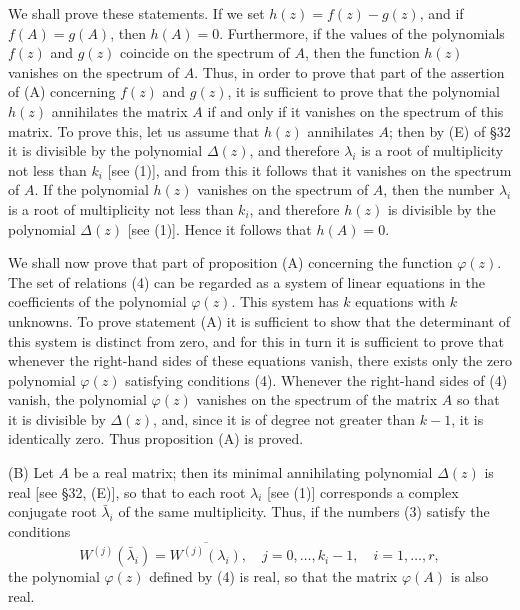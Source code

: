 \documentclass[10pt,a5paper]{book}
\theoremstyle{plain}
\theoremstyle{definition}
\theoremstyle{remark}
\begin{document}
We shall prove these statements. If we set $h(z)=f(z)-g(z)$, and if $f(A)=g(A)$, then $h(A)=0$. Furthermore, if the values of the polynomials $f(z)$ and $g(z)$ coincide on the spectrum of $A$, then the function $h(z)$ vanishes on the spectrum of $A$. Thus, in order to prove that part of the assertion of (A) concerning $f(z)$ and $g(z)$, it is sufficient to prove that the polynomial $h(z)$ annihilates the matrix $A$ if and only if it vanishes on the spectrum of this matrix. To prove this, let us assume that $h(z)$ annihilates $A$; then by (E) of §32 it is divisible by the polynomial $\Delta(z)$, and therefore $\lambda_{i}$ is a root of multiplicity not less than $k_{i}$ [see (1)], and from this it follows that it vanishes on the spectrum of $A$. If the polynomial $h(z)$ vanishes on the spectrum of $A$, then the number $\lambda_{i}$ is a root of multiplicity not less than $k_{i}$, and therefore $h(z)$ is divisible by the polynomial $\Delta(z)$ [see (1)]. Hence it follows that $h(A)=0$.

We shall now prove that part of proposition (A) concerning the function $\varphi(z)$. The set of relations (4) can be regarded as a system of linear equations in the coefficients of the polynomial $\varphi(z)$. This system has $k$ equations with $k$ unknowns. To prove statement (A) it is sufficient to show that the determinant of this system is distinct from zero, and for this in turn it is sufficient to prove that whenever the right-hand sides of these equations vanish, there exists only the zero polynomial $\varphi(z)$ satisfying conditions (4). Whenever the right-hand sides of (4) vanish, the polynomial $\varphi(z)$ vanishes on the spectrum of the matrix $A$ so that it is divisible by $\Delta(z)$, and, since it is of degree not greater than $k-1$, it is identically zero. Thus proposition (A) is proved.

(B) Let $A$ be a real matrix; then its minimal annihilating polynomial $\Delta(z)$ is real [see §32, (E)], so that to each root $\lambda_{i}$ [see (1)] corresponds a complex conjugate root $\bar{\lambda}_{i}$ of the same multiplicity. Thus, if the numbers (3) satisfy the conditions
\begin{equation*}
W^{(j)}\left(\bar{\lambda}_{i}\right)=\overline{W^{(j)}\left(\lambda_{i}\right)}, \quad j=0, \ldots, k_{i}-1, \quad i=1, \ldots, r, \tag{5}
\end{equation*}
the polynomial $\varphi(z)$ defined by (4) is real, so that the matrix $\varphi(A)$ is also real.
\end{document}
